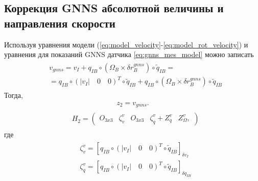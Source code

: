 \documentclass[a4paper,12pt]{article}
\begin{document}
\subsection{Коррекция GNNS абсолютной величины и направления скорости}
Используя уравнения модели (\ref{eq:model_velocity}-\ref{eq:model_rot_velocity}) и уравнения для показаний GNNS датчика \eqref{eq:gnns_mes_model} можно записать
\begin{align}
\begin{split}
&v_{gnns} = v_I + q_{IB} \circ  (\Omega_B \times \delta r^{gnns}_B) \circ \tilde{q}_{IB} = \\
& = q_{IB} \circ (|v_I| \quad 0 \quad 0)^T \circ \tilde{q}_{IB} + q_{IB} \circ  (\Omega_B \times \delta r^{gnns}_B) \circ \tilde{q}_{IB}
\end{split}
\end{align}
Тогда, 
\begin{align}
z_2 = v_{gnns}.
\end{align}
\begin{align}
\begin{split}
&H_2 =
\begin{pmatrix}
O_{3x3} & \zeta^v_v & O_{3x3} & \zeta^v_q + Z^v_q & Z^v_{\Omega},
\end{pmatrix}
\end{split}
\end{align}
где
\begin{align}
\begin{split}
&\zeta^v_v = [q_{IB} \circ (|v_I| \quad 0 \quad 0)^T \circ \tilde{q}_{IB}]_{\delta v_I} \\
&\zeta^v_q = [q_{IB} \circ (|v_I| \quad 0 \quad 0)^T \circ \tilde{q}_{IB}]_{\delta q_{IB}}
\end{split}
\end{align}
\end{document}
